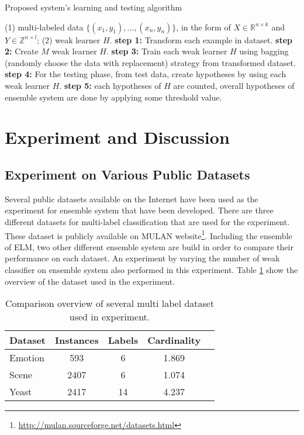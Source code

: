 \documentclass{article}
\begin{document}
\begin{algorithm}[tb]
   \caption{Proposed system's learning and testing algorithm}
   \label{alg:example}
\begin{algorithmic}
    (1) multi-labeled data $\{(x_1, y_1),\dots,(x_n,y_n)\}$, in the form of $X \in \mathbb{R}^{n \times k}$ and $Y \in \mathbb{Z}^{n \times l}$; (2) weak learner $H$.
   \STATE \textbf{step 1:} Transform each example in dataset.
   \STATE \textbf{step 2:} Create $M$ weak learner $H$.
   \STATE \textbf{step 3:} Train each weak learner $H$ using bagging (randomly choose the data with replacement) strategy from transformed dataset.
   \STATE \textbf{step 4:} For the testing phase, from test data, create hypotheses by using each weak learner $H$.
   \STATE \textbf{step 5:} each hypotheses of $H$ are counted, overall hypotheses of ensemble system are done by applying some threshold value.
\end{algorithmic}
\end{algorithm}


\section{Experiment and Discussion}
\label{expr}

\subsection{Experiment on Various Public Datasets}
\label{expr1}

Several public datasets available on the Internet have been used as the experiment for ensemble system that have been developed. There are three different datasets for multi-label classification that are used for the experiment. These dataset is publicly available on MULAN website\footnote{\url{http://mulan.sourceforge.net/datasets.html}}. Including the ensemble of ELM, two other different ensemble system are build in order to compare their performance on each dataset. An experiment by varying the number of weak classifier on ensemble system also performed in this experiment. Table \ref{tab:dataset} show the overview of the dataset used in the experiment.

\begin{table}[t]
\caption{Comparison overview of several multi label dataset used in experiment.}
\label{tab:dataset}
\vskip 0.15in
\begin{center}
\begin{small}
\begin{sc}
\begin{tabular}{lcccr}
\hline
\abovespace\belowspace
Dataset & Instances & Labels & Cardinality \\
\hline
\abovespace
Emotion    	& 593 & 6 & 1.869 \\
Scene 		& 2407 & 6 & 1.074 \\
\belowspace
Yeast    	& 2417 & 14 & 4.237 \\
\hline
\end{tabular}
\end{sc}
\end{small}
\end{center}
\vskip -0.1in
\end{table}
\end{document}
